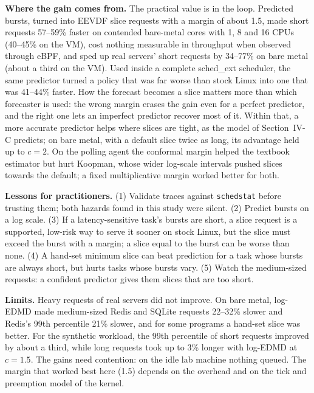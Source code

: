 \documentclass{article}
\begin{document}
\textbf{Where the gain comes from.} The practical value is in the loop. Predicted bursts, turned into EEVDF slice requests with a margin of about 1.5, made short requests 57--59\% faster on contended bare-metal cores with 1, 8 and 16 CPUs (40--45\% on the VM), cost nothing measurable in throughput when observed through eBPF, and sped up real servers' short requests by 34--77\% on bare metal (about a third on the VM). Used inside a complete sched\_ext scheduler, the same predictor turned a policy that was far worse than stock Linux into one that was 41--44\% faster. How the forecast becomes a slice matters more than which forecaster is used: the wrong margin erases the gain even for a perfect predictor, and the right one lets an imperfect predictor recover most of it. Within that, a more accurate predictor helps where slices are tight, as the model of Section~IV-C predicts; on bare metal, with a default slice twice as long, its advantage held up to $c=2$. On the polling agent the conformal margin helped the textbook estimator but hurt Koopman, whose wider log-scale intervals pushed slices towards the default; a fixed multiplicative margin worked better for both.

\textbf{Lessons for practitioners.} (1) Validate traces against \texttt{schedstat} before trusting them; both hazards found in this study were silent. (2) Predict bursts on a log scale. (3) If a latency-sensitive task's bursts are short, a slice request is a supported, low-risk way to serve it sooner on stock Linux, but the slice must exceed the burst with a margin; a slice equal to the burst can be worse than none. (4) A hand-set minimum slice can beat prediction for a task whose bursts are always short, but hurts tasks whose bursts vary. (5) Watch the medium-sized requests: a confident predictor gives them slices that are too short.

\textbf{Limits.} Heavy requests of real servers did not improve. On bare metal, log-EDMD made medium-sized Redis and SQLite requests 22--32\% slower and Redis's 99th percentile 21\% slower, and for some programs a hand-set slice was better. For the synthetic workload, the 99th percentile of short requests improved by about a third, while long requests took up to 3\% longer with log-EDMD at $c=1.5$. The gains need contention: on the idle lab machine nothing queued. The margin that worked best here (1.5) depends on the overhead and on the tick and preemption model of the kernel.
\end{document}

